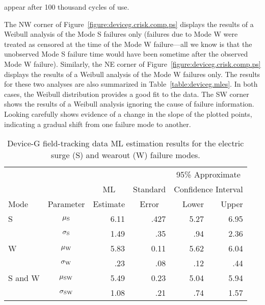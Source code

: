\begin{example}
appear after 100 thousand cycles of use.
\begin{sidewaysfigure}
\caption{Weibull analyses of Device-G data 
estimating time to failure Mode S only, failure Mode W
only, and ignoring the cause of failure.}
\label{figure:deviceg.crisk.comp.ps}
\end{sidewaysfigure}
The NW corner of Figure~\ref{figure:deviceg.crisk.comp.ps} displays
the results of a Weibull analysis of the Mode S failures only
(failures due to Mode W were treated as censored at the time of the
Mode W failure---all we know is that the unobserved Mode S failure
time would have been sometime after the observed Mode W failure).
Similarly, the NE corner of
Figure~\ref{figure:deviceg.crisk.comp.ps} displays the results of a
Weibull analysis of the Mode W failures only. The results for these
two analyses are also summarized in Table~\ref{table:deviceg.mles}.
In both cases, the Weibull distribution provides a good fit to the
data. The SW corner shows the results of a Weibull analysis ignoring
the cause of failure information. Looking carefully shows evidence
of a change in the slope of the plotted points, indicating a gradual
shift from one failure mode to another.
\begin{table}
\caption{Device-G field-tracking data ML estimation results for the
electric surge (S) and
wearout (W) failure modes.}
\centering\small
\begin{tabular}{lcrrrr} 
\\[-.5ex]
\hline
& & & & \multicolumn{2}{c}{95\% Approximate}\\
& &\multicolumn{1}{c}{ML} &Standard & 
\multicolumn{2}{c}{Confidence Interval}\\
Mode & Parameter &
 \multicolumn{1}{c}{Estimate}& \multicolumn{1}{c}{Error} & Lower & Upper \\
\hline 
S&$\mu_{\rm S} $ & 6.11 & .427 &  5.27  & 6.95 \\[.7ex] 
&$\sigma_{\rm S}$ & 1.49 & .35 &  .94 &  2.36\\[1.2ex]
\hline 
W&$\mu_{\rm W} $ & 5.83 & 0.11 & 5.62 & 6.04 \\[.7ex] 
&$\sigma_{\rm W}$ &.23 &.08 & .12 & .44 \\[.7ex]\hline 
S and W&$\mu_{\rm SW} $ & 5.49 & 0.23 & 5.04 & 5.94 \\[.7ex] 
&$\sigma_{\rm SW}$ &1.08 &.21 & .74 & 1.57 \\[.7ex]\hline 

\end{tabular}
\end{table}
\end{example}
